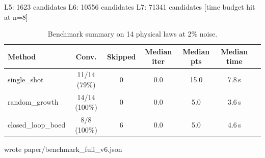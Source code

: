   L5: 1623 candidates
  L6: 10556 candidates
  L7: 71341 candidates
  [time budget hit at n=8]

\begin{table}[h]
\centering
\caption{Benchmark summary on 14 physical laws at 2\% noise.}
\begin{tabular}{lcccccc}
\hline
Method & Conv. & Skipped & Median iter & Median pts & Median time \\
\hline
single\_shot & 11/14 (79\%) & 0 & 0.0 & 15.0 & 7.8\,s \\
random\_growth & 14/14 (100\%) & 0 & 0.0 & 5.0 & 3.6\,s \\
closed\_loop\_boed & 8/8 (100\%) & 6 & 0.0 & 5.0 & 4.6\,s \\
\hline
\end{tabular}
\end{table}

  wrote paper/benchmark_full_v6.json
